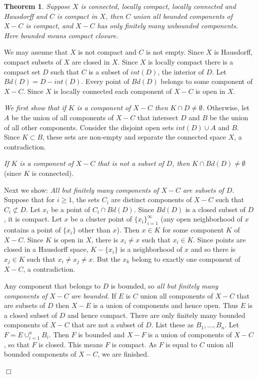 \documentclass[12pt]{article}
\newtheorem{theorem}{Theorem}[subsection]
\newenvironment{proof}{\addvspace{12pt}\noindent{\bf Proof:}}{
$\Box$\par\addvspace{12pt}}
\begin{document}
\begin{theorem} \label{ES}  Suppose $X$ is connected, locally compact, locally connected
and Hausdorff and $C$ is compact in $X$,
then $C$ union all bounded components of $X - C$ is compact, and $X-C$ has only finitely many unbounded components.
Here bounded means compact closure.
\end{theorem}

\begin{proof}
We may assume that $X$ is not compact and $C$ is not empty. Since $X$ is Hausdorff, compact subsets of $X$ are closed in $X$. Since $X$ is locally compact there is a compact set $D$ such that $C$ is a subset of $int(D)$, the interior of $D$. Let $Bd(D)=D-int(D)$. Every point of $Bd(D)$ belongs to some component of $X-C$. Since $X$ is locally connected each component of $X-C$ is open in $X$. 

{\it We first show that if $K$ is a component of $X-C$ then $K\cap D\ne \emptyset$.} Otherwise, let $A$ be the union of all components of $X-C$ that intersect $D$ and $B$ be the union of all other components. Consider the disjoint open sets $int(D) \cup A$ and $B$. Since $K\subset B$, these sets are non-empty and separate the connected space $X$, a contradiction.

{\it If $K$ is a component of $X-C$ that is not a subset of $D$, then $K\cap Bd(D)\ne\emptyset$} (since $K$ is connected).


Next we show: {\it All but finitely many components of $X-C$ are subsets of $D$.} Suppose that for $i\geq 1$, the sets $C_i$ are distinct components of $X-C$ such that $C_i\not\subset D$. Let $x_i$ be a point of $C_i\cap Bd(D)$. Since $Bd(D)$ is a closed subset of $D$, it is compact. Let $x$ be a cluster point of $\{x_i\}_{i=1}^\infty$ (any open neighborhood of $x$ contains a point of $\{x_i\}$ other than $x$).  
Then $x\in K$ for some component $K$ of $X-C$. Since $K$ is open in $X$, there is $x_i\ne x$ such that $x_i\in K$. Since points are closed in a Hausdorff space, $K-\{x_i\}$ is a neighborhood of $x$ and so there is $x_j\in K$ such that $x_i\ne x_j\ne x$.   But the $x_k$ belong to exactly one component of $X-C$, a contradiction.

Any component that belongs to $D$ is bounded, so {\it all but finitely many components of $X-C$ are bounded.} If $E$ is $C$ union all components of $X-C$ that are subsets of $D$ then $X-E$ is a union of components and hence open. Thus $E$ is a closed subset of $D$ and hence compact. There are only finitely many bounded components of $X-C$ that are not a subset of $D$. List these as $B_1, \ldots , B_n$. Let $F=E\cup_{i=1}^nB_i$. Then $F$ is bounded and $X-F$ is a union of components of $X-C$, so that $F$ is closed. This means $F$ is compact. As $F$ is equal to $C$ union all bounded components of $X-C$, we are finished.
\end{proof}
\end{document}

